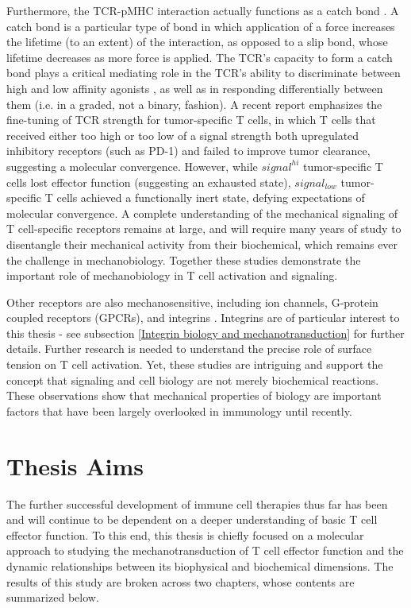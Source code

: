 Furthermore, the TCR-pMHC interaction actually functions as a catch bond \cite{Liu2014}. A catch bond is a particular type of bond in which application of a force increases the lifetime (to an extent) of the interaction, as opposed to a slip bond, whose lifetime decreases as more force is applied. The TCR's capacity to form a catch bond plays a critical mediating role in the TCR's ability to discriminate between high and low affinity agonists \cite{Liu2014}, as well as in responding differentially between them (i.e. in a graded, not a binary, fashion). A recent report emphasizes the fine-tuning of TCR strength for tumor-specific T cells, in which T cells that received either too high or too low of a signal strength  both upregulated inhibitory receptors (such as PD-1) and failed to improve tumor clearance, suggesting a molecular convergence. However, while $signal^{hi}$ tumor-specific T cells lost effector  function (suggesting an exhausted state), $signal_{low}$ tumor-specific T cells achieved a functionally inert state, defying expectations of molecular convergence. A complete understanding of the mechanical signaling of T cell-specific receptors remains at large, and will require many years of study to disentangle their mechanical activity from their biochemical, which remains ever the challenge in mechanobiology. Together these studies demonstrate the important role of mechanobiology in T cell activation and signaling.


Other receptors are also mechanosensitive, including ion channels, G-protein coupled receptors (GPCRs), and integrins \cite{Moroni, Iliff2018, Sun2016}. Integrins are of particular interest to this thesis - see subsection \ref{Integrin biology and mechanotransduction} for further details. Further research is needed to understand the precise role of surface tension on T cell activation. Yet, these studies are intriguing and support the concept that signaling and cell biology are not merely biochemical reactions. These observations show that mechanical properties of biology are important factors that have been largely overlooked in immunology until recently. 

\section{Thesis Aims}
The further successful development of immune cell therapies thus far has been and will continue to be dependent on a deeper understanding of basic T cell effector function. To this end, this thesis is chiefly focused on a molecular approach to studying the mechanotransduction of T cell effector function and the dynamic relationships between its biophysical and biochemical dimensions. The results of this study are broken across two chapters, whose contents are summarized below.

